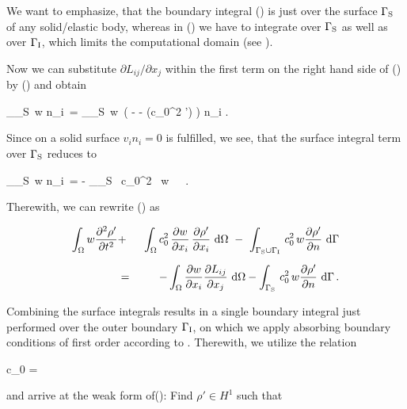 \documentclass[a4paper,10pt]{article}
\begin{document}
\noindent
We want  to emphasize, that  the boundary integral ()  is just
over the  surface $\Gamma_{\rm S}$  of any solid/elastic body,  whereas in
() we have to integrate  over $\Gamma_{\rm S}$ as well as over
$\Gamma_{\rm   I}$,   which   limits   the   computational   domain   (see
).

Now we  can substitute $\partial L_{ij}  / \partial x_j$  within the first
term on the  right hand side of ()  by () and
obtain

\int_{\Gamma_{\rm S}}\, w  n_i\,
\rd \Gamma
= \int_{\Gamma_{\rm S}}\, w\, \left( -  -  (c_0^2 \rho')
\right)  n_i\,\rd \Gamma\,.
\ee

\noindent
Since on  a solid surface  $v_i n_i  = 0$ is  fulfilled, we see,  that the
surface integral term over $\Gamma_{\rm S}$ reduces to

\int_{\Gamma_{\rm S}}\, w  n_i\,
\rd \Gamma = - \int_{\Gamma_{\rm S}} \, c_0^2 \, w \, \, \rd\Gamma\,.
\ee

\noindent
Therewith, we can rewrite () as

\begin{eqnarray}
\int_\Omega w \frac{\partial^2 \rho'}{\partial t^2} 
& + & \ \int_\Omega c_0^2\, \frac{\partial w}{\partial x_i} \, \frac{\partial
  \rho'}{\partial x_i} \, {\,\rm d} \Omega 
\ -\ \int_{\Gamma_{\rm S} \cup \Gamma_{\rm I}}\, c_0^2 \, w
\frac{\partial \rho'}{\partial n}\, {\,\rm d} \Gamma \nonumber \\[2mm]
&=&
- \int_\Omega \frac{\partial w}{\partial x_i} \frac{\partial
  L_{ij}}{\partial x_j}\, {\,\rm d} \Omega -
\int_{\Gamma_{\rm S}}\, c_0^2 \, w \frac{\partial \rho'}{\partial n}\, {\,\rm d} \Gamma
\,.
\end{eqnarray}

\noindent  Combining  the  surface  integrals  results in  a  single  boundary
integral just performed over the  outer boundary $\Gamma_{\rm I}$, on which we
apply   absorbing   boundary   conditions   of  first   order   according   to
\cite{Engquist1977}. Therewith, we utilize the relation

c_0  = 
\ee

\noindent and  arrive at the  weak form of(): Find  $\rho' \in
H^1$ such that
\end{document}
